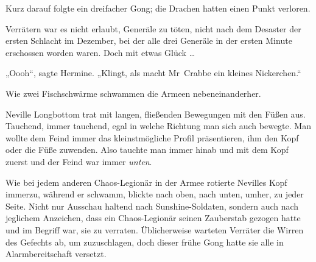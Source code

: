 Kurz darauf folgte ein dreifacher Gong; die Drachen hatten einen Punkt verloren.

Verrätern war es nicht erlaubt, Generäle zu töten, nicht nach dem Desaster der ersten Schlacht im Dezember, bei der alle drei Generäle in der ersten Minute erschossen worden waren. Doch mit etwas Glück …

„Oooh“, sagte Hermine.
„Klingt, als macht Mr~Crabbe ein kleines Nickerchen.“

\later

Wie zwei Fischschwärme schwammen die Armeen nebeneinanderher.

Neville Longbottom trat mit langen, fließenden Bewegungen mit den Füßen aus. Tauchend, immer tauchend, egal in welche Richtung man sich auch bewegte. Man wollte dem Feind immer das kleinstmögliche Profil präsentieren, ihm den Kopf oder die Füße zuwenden. Also tauchte man immer hinab und mit dem Kopf zuerst und der Feind war immer \emph{unten}.

Wie bei jedem anderen Chaos-Legionär in der Armee rotierte Nevilles Kopf immerzu, während er schwamm, blickte nach oben, nach unten, umher, zu jeder Seite. Nicht nur Ausschau haltend nach Sunshine-Soldaten, sondern auch nach jeglichem Anzeichen, dass ein Chaos-Legionär seinen Zauberstab gezogen hatte und im Begriff war, sie zu verraten. Üblicherweise warteten Verräter die Wirren des Gefechts ab, um zuzuschlagen, doch dieser frühe Gong hatte sie alle in Alarmbereitschaft versetzt.


